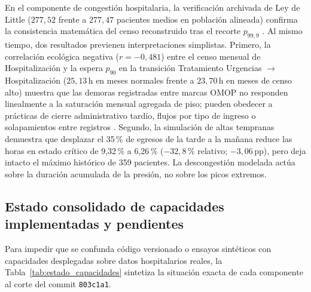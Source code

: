 En el componente de congestión hospitalaria, la verificación archivada de Ley de Little ($277{,}52$ frente a $277{,}47$ pacientes medios en población alineada) confirma la consistencia matemática del censo reconstruido tras el recorte $p_{99{,}9}$ \parencite{mediflow2026informe}. Al mismo tiempo, dos resultados previenen interpretaciones simplistas. Primero, la correlación ecológica negativa ($r = -0{,}481$) entre el censo mensual de Hospitalización y la espera $p_{90}$ en la transición Tratamiento Urgencias $\rightarrow$ Hospitalización ($25{,}13$\,h en meses normales frente a $23{,}70$\,h en meses de censo alto) muestra que las demoras registradas entre marcas OMOP no responden linealmente a la saturación mensual agregada de piso; pueden obedecer a prácticas de cierre administrativo tardío, flujos por tipo de ingreso o solapamientos entre registros \parencite{mediflow2026optimizacion}. Segundo, la simulación de altas tempranas demuestra que desplazar el 35\,\% de egresos de la tarde a la mañana reduce las horas en estado crítico de 9,32\,\% a 6,26\,\% ($-32{,}8\,\%$ relativo; $-3{,}06$\,pp), pero deja intacto el máximo histórico de 359 pacientes. La descongestión modelada actúa sobre la duración acumulada de la presión, no sobre los picos extremos.

\subsection{Estado consolidado de capacidades implementadas y pendientes}

Para impedir que se confunda código versionado o ensayos sintéticos con capacidades desplegadas sobre datos hospitalarios reales, la Tabla~\ref{tab:estado_capacidades} sintetiza la situación exacta de cada componente al corte del commit \texttt{803c1a1}.

